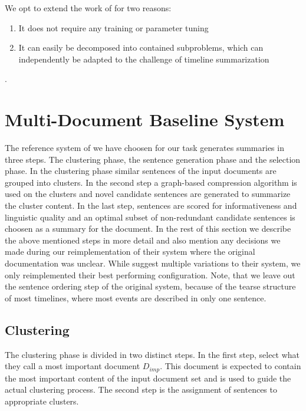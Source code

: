 \documentclass[a4paper,BCOR=10mm]{report}
\begin{document}
We opt to extend the work of \citep{banerjee} for two reasons:

\begin{enumerate}
\item{It does not require any training or parameter tuning}
\item{It can easily be decomposed into contained subproblems, which can independently be adapted to the challenge of timeline summarization}
\end{enumerate}.


\section{Multi-Document Baseline System} \label{sec:mds-baseline}

The reference system of \citet{banerjee} we have choosen for our task generates summaries in three steps. The clustering phase, the sentence generation phase and the selection phase. In the clustering phase similar sentences of the input documents are grouped into clusters. In the second step a graph-based compression algorithm is used on the clusters and novel candidate sentences are generated to summarize the cluster content. In the last step, sentences are scored for informativeness and linguistic quality and an optimal subset of non-redundant candidate sentences is choosen as a summary for the document. In the rest of this section we describe the above mentioned steps in more detail and also mention any decisions we made during our reimplementation of their system where the original documentation was unclear.
While \citeauthor{banerjee} suggest multiple variations to their system, we only reimplemented their best performing configuration. Note, that we leave out the sentence ordering step of the original system, because of the tearse structure of most timelines, where most events are described in only one sentence.

\subsection{Clustering}  \label{sec:baseline-clustering}

The clustering phase is divided in two distinct steps. In the first step, \citeauthor{banerjee} select what they call a most important document $D_{imp}$. This document is expected to contain the most important content of the input document set and is used to guide the actual clustering process. The second step is the assignment of sentences to appropriate clusters.
\end{document}

